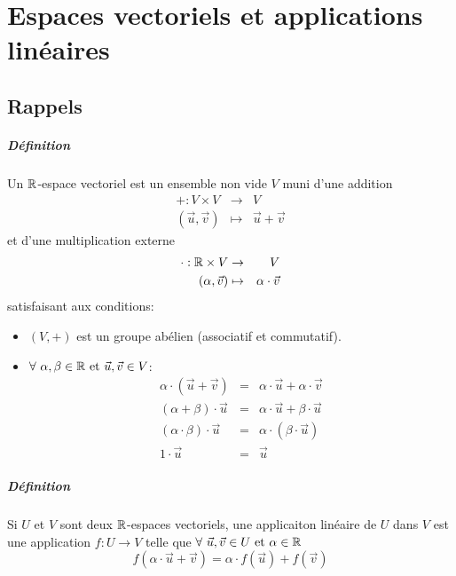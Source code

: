 \chapter{Espaces vectoriels et applications linéaires}

%
%
\section{Rappels}
\label{sec:espv_applin__rapp}
%
%
\paragraph{Définition} Un $\mathbb{R}$-espace vectoriel est un ensemble non vide $V$ muni d'une addition
\begin{eqnarray*}
  +: V \times V &\rightarrow& V \\
  (\vec{u}, \vec{v}) &\mapsto& \vec{u} + \vec{v}
\end{eqnarray*}
et d'une multiplication externe
\begin{eqnarray*}
  \cdot: \mathbb{R} \times V &\rightarrow& V \\
  (\alpha, \vec{v}) &\mapsto& \alpha \cdot \vec{v}
\end{eqnarray*}
satisfaisant aux conditions:
\begin{itemize}
  \item $(V, +)$ est un groupe abélien (associatif et commutatif).
  \item $\forall ~ \alpha, \beta \in \mathbb{R} \text{ et } \vec{u}, \vec{v} \in V$:
    \begin{eqnarray*}
      \alpha \cdot (\vec{u} + \vec{v}) &=& \alpha \cdot \vec{u} + \alpha \cdot \vec{v} \\
      (\alpha + \beta) \cdot \vec{u} &=& \alpha \cdot \vec{u} + \beta \cdot \vec{u} \\
      (\alpha \cdot \beta)\cdot \vec{u} &=& \alpha \cdot (\beta \cdot \vec{u}) \\
      1 \cdot \vec{u} &=& \vec{u}
    \end{eqnarray*}
\end{itemize}

\paragraph{Définition} Si $U$ et $V$ sont deux $\mathbb{R}$-espaces vectoriels, une applicaiton linéaire de $U$ dans $V$ est une application $f: U \rightarrow V$ telle que $\forall ~ \vec{u}, \vec{v} \in U \text{ et } \alpha \in \mathbb{R}$
$$f(\alpha \cdot \vec{u} + \vec{v}) = \alpha \cdot f(\vec{u}) + f(\vec{v})$$

